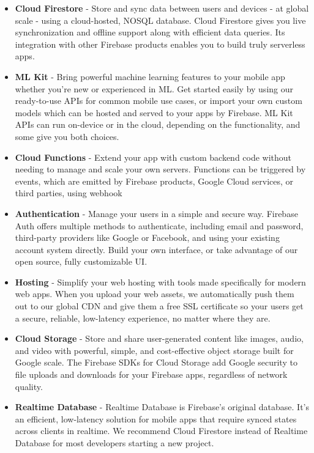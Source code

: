 \begin{itemize}
    \item \textbf{Cloud Firestore} - Store and sync data between users and devices - at global scale - using a cloud-hosted, NOSQL database. Cloud Firestore gives you live synchronization and offline support along with efficient data queries. Its integration with other Firebase products enables you to build truly serverless apps.
    \item \textbf{ML Kit} - Bring powerful machine learning features to your mobile app whether you're new or experienced in ML. Get started easily by using our ready-to-use APIs for common mobile use cases, or import your own custom models which can be hosted and served to your apps by Firebase. ML Kit APIs can run on-device or in the cloud, depending on the functionality, and some give you both choices.
    \item \textbf{Cloud Functions} - Extend your app with custom backend code without needing to manage and scale your own servers. Functions can be triggered by events, which are emitted by Firebase products, Google Cloud services, or third parties, using webhook
    \item \textbf{Authentication} - Manage your users in a simple and secure way. Firebase Auth offers multiple methods to authenticate, including email and password, third-party providers like Google or Facebook, and using your existing account system directly. Build your own interface, or take advantage of our open source, fully customizable UI.
    \item \textbf{Hosting} - Simplify your web hosting with tools made specifically for modern web apps. When you upload your web assets, we automatically push them out to our global CDN and give them a free SSL certificate so your users get a secure, reliable, low-latency experience, no matter where they are.
    \item \textbf{Cloud Storage} - Store and share user-generated content like images, audio, and video with powerful, simple, and cost-effective object storage built for Google scale. The Firebase SDKs for Cloud Storage add Google security to file uploads and downloads for your Firebase apps, regardless of network quality.
    \item \textbf{Realtime Database} - Realtime Database is Firebase's original database. It's an efficient, low-latency solution for mobile apps that require synced states across clients in realtime. We recommend Cloud Firestore instead of Realtime Database for most developers starting a new project.
\end{itemize}

